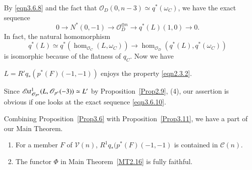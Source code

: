 By \eqref{eqn3.6.8} and the fact that $\mathscr{O}_D(0,n-3)\simeq
q^{\ast}(\omega_C)$, we have the exact sequence 
\begin{equation}
0\to N^{\ast}(0,-1)\to \mathscr{O}^{\oplus n}_D\to q^{\ast}(L)(1,0)\to 0.\tag{3.10}\label{eqn3.6.10}
\end{equation}
In fact, the natural homomorphism 
$$
q^{\ast}(L)\simeq
q^{\ast}(\hom_{\mathscr{O}_C}(L,\omega_C))\to
\hom_{\mathscr{O}_D}(q^{\ast}(L),q^{\ast}(\omega_C))
$$ 
is isomorphic because of the flatness of $q_C$. Now we have 

\setcounter{dfn}{10}
\begin{Prop}\label{Prop3.11}
$L=R'q_{\ast}(p^{\ast}(F)(-1,-1))$ enjoys the property \ref{eqn2.3.2}.
\end{Prop}

\begin{Proof}
Since $\mathscr{E}\!{\it xt}^{1}_{\mathscr{O}_{P^{\ast}}}(L,\mathscr{O}_{p^{*}}(-3))\simeq L'$ by
Proposition~\ref{Prop2.9}, (4), our assertion is obvious if one looks
at the exact sequence \eqref{eqn3.6.10}.

Combining Proposition~\ref{Prop3.6} with Proposition~\ref{Prop3.11},
we have a part of our Main Theorem.
\enprf
\end{Proof}

\begin{cor}\label{cor3.11.1}\pageoriginale
\begin{enumerate}
\renewcommand{\labelenumi}{(\theenumi)}
\item For a member $F$ of $\mathscr{V}(n)$,
  $R^{1}q_{\ast}(p^{\ast}(F)(-1,-1)$ is contained in
  $\mathscr{C}(n)$. 

\item The functor $\Phi$ in Main Theorem~\ref{MT2.16} is fully
  faithful. 
\end{enumerate}
\end{cor}

